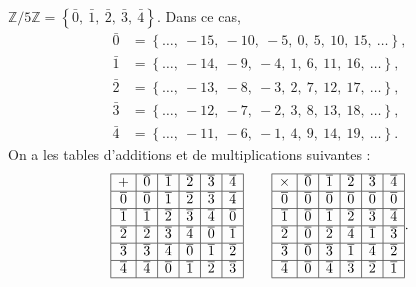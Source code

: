       \begin{ex}
            $\mathbb{Z}/5\mathbb{Z} = \left\lbrace \bar{0},\ \bar{1},\ \bar{2},\ \bar{3},\ \bar{4} \right\rbrace$.
            Dans ce cas, 
            \begin{align*}
                  \bar{0} & = \left\lbrace \ldots ,\ -15,\ -10,\ -5,\ 0,\ 5,\ 10,\ 15,\ \ldots \right\rbrace ,\\
                  \bar{1} & = \left\lbrace \ldots ,\ -14,\ -9,\ -4,\ 1,\ 6,\ 11,\ 16,\ \ldots \right\rbrace  ,\\
                  \bar{2} & = \left\lbrace \ldots ,\ -13,\ -8,\ -3,\ 2,\ 7,\ 12,\ 17,\ \ldots \right\rbrace  ,\\
                  \bar{3} & = \left\lbrace \ldots ,\ -12,\ -7,\ -2,\ 3,\ 8,\ 13,\ 18,\ \ldots \right\rbrace  ,\\
                  \bar{4} & = \left\lbrace \ldots ,\ -11,\ -6,\ -1,\ 4,\ 9,\ 14,\ 19,\ \ldots \right\rbrace  .
            \end{align*}
            On a les tables d'additions et de multiplications suivantes :
                  \[
                  \begin{array}{|c|c|c|c|c|c|}
                  \hline 
                  + & \bar{0} & \bar{1} & \bar{2} & \bar{3} & \bar{4} \\ 
                  \hline 
                  \bar{0} & \bar{0} & \bar{1} & \bar{2} & \bar{3} & \bar{4} \\ 
                  \hline 
                  \bar{1} & \bar{1} & \bar{2} & \bar{3} & \bar{4} & \bar{0} \\ 
                  \hline 
                  \bar{2} & \bar{2} & \bar{3} & \bar{4} & \bar{0} & \bar{1} \\ 
                  \hline 
                  \bar{3} & \bar{3} & \bar{4} & \bar{0} & \bar{1} & \bar{2} \\ 
                  \hline 
                  \bar{4} & \bar{4} & \bar{0} & \bar{1} & \bar{2} & \bar{3} \\ 
                  \hline 
                  \end{array}
                  \qquad
                  \begin{array}{|c|c|c|c|c|c|}
                  \hline 
                  \times & \bar{0} & \bar{1} & \bar{2} & \bar{3} & \bar{4} \\ 
                  \hline 
                  \bar{0} & \bar{0} & \bar{0} & \bar{0} & \bar{0} & \bar{0} \\ 
                  \hline 
                  \bar{1} & \bar{0} & \bar{1} & \bar{2} & \bar{3} & \bar{4} \\ 
                  \hline 
                  \bar{2} & \bar{0} & \bar{2} & \bar{4} & \bar{1} & \bar{3} \\ 
                  \hline 
                  \bar{3} & \bar{0} & \bar{3} & \bar{1} & \bar{4} & \bar{2} \\ 
                  \hline 
                  \bar{4} & \bar{0} & \bar{4} & \bar{3} & \bar{2} & \bar{1} \\ 
                  \hline 
                  \end{array}
                  .
                  \] 
      \end{ex}
